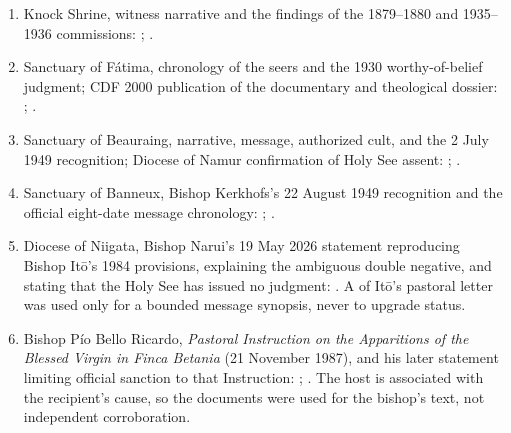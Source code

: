 \begin{enumerate}
  \item Knock Shrine, witness narrative and the findings of the 1879--1880 and 1935--1936 commissions: ; .
  \item Sanctuary of Fátima, chronology of the seers and the 1930 worthy-of-belief judgment; CDF 2000 publication of the documentary and theological dossier: ; .
  \item Sanctuary of Beauraing, narrative, message, authorized cult, and the 2 July 1949 recognition; Diocese of Namur confirmation of Holy See assent: ; .
  \item Sanctuary of Banneux, Bishop Kerkhofs's 22 August 1949 recognition and the official eight-date message chronology: ; .
  \item Diocese of Niigata, Bishop Narui's 19 May 2026 statement reproducing Bishop Itō's 1984 provisions, explaining the ambiguous double negative, and stating that the Holy See has issued no judgment: . A  of Itō's pastoral letter was used only for a bounded message synopsis, never to upgrade status.
  \item Bishop Pío Bello Ricardo, \emph{Pastoral Instruction on the Apparitions of the Blessed Virgin in Finca Betania} (21 November 1987), and his later statement limiting official sanction to that Instruction: ; . The host is associated with the recipient's cause, so the documents were used for the bishop's text, not independent corroboration.

\end{enumerate}
